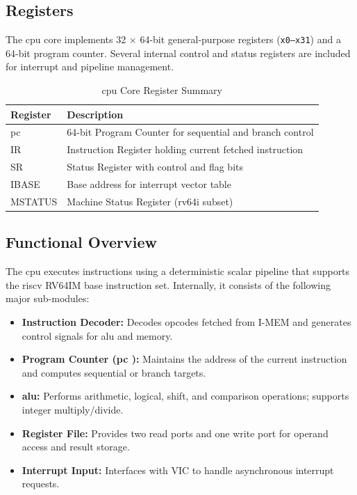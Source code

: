 \subsection{Registers}
The \gls{cpu} core implements 32 × 64-bit general-purpose registers
(\texttt{x0–x31}) and a 64-bit program counter. Several internal control and
status registers are included for interrupt and \gls{pipeline} management.

\begin{table}[H]
    \centering
    \caption{\gls{cpu} Core Register Summary}
    \label{tab:cpu_registers}
    \begin{tabular}{|l|l|}
        \hline
        \textbf{Register} & \textbf{Description}                                     \\ \hline
        \gls{pc}          & 64-bit Program Counter for sequential and branch control \\ \hline
        IR                & Instruction Register holding current fetched instruction \\ \hline
        SR                & Status Register with control and flag bits               \\ \hline
        IBASE             & Base address for interrupt vector table                  \\ \hline
        MSTATUS           & Machine Status Register (\gls{rv64i} subset)             \\ \hline
    \end{tabular}
\end{table}

\subsection{Functional Overview}
The \gls{cpu} executes instructions using a deterministic scalar \gls{pipeline}
that supports the \gls{riscv} RV64IM base instruction set. Internally, it
consists of the following major sub-modules:
\begin{itemize}
    \item \textbf{Instruction Decoder:} Decodes opcodes fetched from \gls{I-MEM} and generates control signals for \gls{alu} and memory.
    \item \textbf{Program Counter (\gls{pc} ):} Maintains the address of the current instruction and computes sequential or branch targets.
    \item \textbf{\gls{alu}:} Performs arithmetic, logical, shift, and comparison operations; supports integer multiply/divide.
    \item \textbf{Register File:} Provides two read ports and one write port for operand access and result storage.
    \item \textbf{Interrupt Input:} Interfaces with VIC to handle asynchronous interrupt requests.
\end{itemize}

